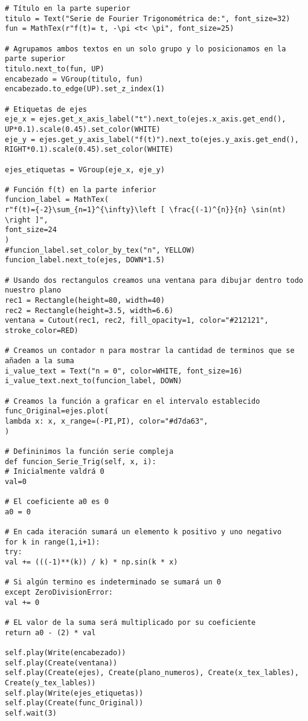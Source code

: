\begin{longlisting}
\begin{verbatim}
# Título en la parte superior
titulo = Text("Serie de Fourier Trigonométrica de:", font_size=32)
fun = MathTex(r"f(t)= t, -\pi <t< \pi", font_size=25)

# Agrupamos ambos textos en un solo grupo y lo posicionamos en la parte superior
titulo.next_to(fun, UP)
encabezado = VGroup(titulo, fun)
encabezado.to_edge(UP).set_z_index(1)

# Etiquetas de ejes
eje_x = ejes.get_x_axis_label("t").next_to(ejes.x_axis.get_end(), UP*0.1).scale(0.45).set_color(WHITE)
eje_y = ejes.get_y_axis_label("f(t)").next_to(ejes.y_axis.get_end(), RIGHT*0.1).scale(0.45).set_color(WHITE)

ejes_etiquetas = VGroup(eje_x, eje_y)

# Función f(t) en la parte inferior
funcion_label = MathTex(
r"f(t)={-2}\sum_{n=1}^{\infty}\left [ \frac{(-1)^{n}}{n} \sin(nt) \right ]",
font_size=24
)
#funcion_label.set_color_by_tex("n", YELLOW)
funcion_label.next_to(ejes, DOWN*1.5)

# Usando dos rectangulos creamos una ventana para dibujar dentro todo nuestro plano
rec1 = Rectangle(height=80, width=40)
rec2 = Rectangle(height=3.5, width=6.6)
ventana = Cutout(rec1, rec2, fill_opacity=1, color="#212121", stroke_color=RED)

# Creamos un contador n para mostrar la cantidad de terminos que se añaden a la suma
i_value_text = Text("n = 0", color=WHITE, font_size=16)
i_value_text.next_to(funcion_label, DOWN)

# Creamos la función a graficar en el intervalo establecido
func_Original=ejes.plot(
lambda x: x, x_range=(-PI,PI), color="#d7da63",
)

# Defininimos la función serie compleja
def funcion_Serie_Trig(self, x, i):
# Inicialmente valdrá 0 
val=0

# El coeficiente a0 es 0
a0 = 0

# En cada iteración sumará un elemento k positivo y uno negativo
for k in range(1,i+1):
try:
val += (((-1)**(k)) / k) * np.sin(k * x)

# Si algún termino es indeterminado se sumará un 0
except ZeroDivisionError:
val += 0 

# EL valor de la suma será multiplicado por su coeficiente    
return a0 - (2) * val

self.play(Write(encabezado))
self.play(Create(ventana))
self.play(Create(ejes), Create(plano_numeros), Create(x_tex_lables), Create(y_tex_lables))
self.play(Write(ejes_etiquetas))
self.play(Create(func_Original))
self.wait(3)



\end{verbatim}
\end{longlisting}
